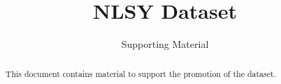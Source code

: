 

\title{NLSY Dataset}
\subtitle{Supporting Material}
\date{}

\maketitle\vspace{-2cm}

\begin{abstract}
\noindent This document contains material to support the promotion of the dataset.
\end{abstract}\vspace{1cm}

\tableofcontents\newpage\listoffigures







\clearpage



